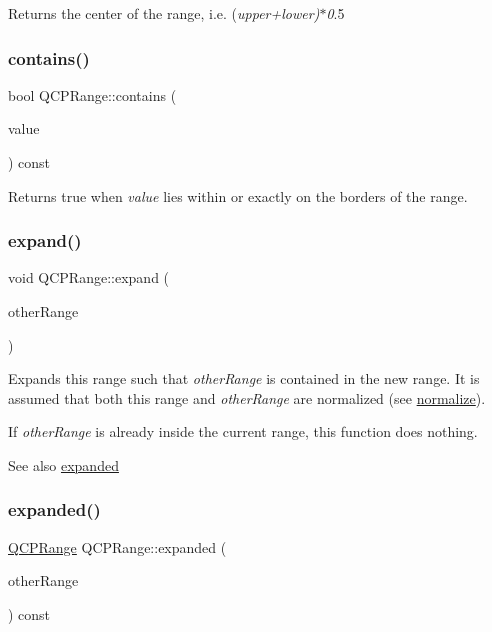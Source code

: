 Returns the center of the range, i.\+e. ({\itshape upper+{\itshape lower})$\ast$0}.5 \hypertarget{class_q_c_p_range_ae9842b48b6d38dc5e9607358e3083cc8}{}\label{class_q_c_p_range_ae9842b48b6d38dc5e9607358e3083cc8} 
\subsubsection{\texorpdfstring{contains()}{contains()}}
{\footnotesize\ttfamily bool Q\+C\+P\+Range\+::contains (\begin{DoxyParamCaption}\item[{double}]{value }\end{DoxyParamCaption}) const}

Returns true when {\itshape value} lies within or exactly on the borders of the range. \hypertarget{class_q_c_p_range_a0fa1bc8048be50d52bea93a8caf08305}{}\label{class_q_c_p_range_a0fa1bc8048be50d52bea93a8caf08305} 
\subsubsection{\texorpdfstring{expand()}{expand()}}
{\footnotesize\ttfamily void Q\+C\+P\+Range\+::expand (\begin{DoxyParamCaption}\item[{const \hyperlink{class_q_c_p_range}{Q\+C\+P\+Range} \&}]{other\+Range }\end{DoxyParamCaption})}

Expands this range such that {\itshape other\+Range} is contained in the new range. It is assumed that both this range and {\itshape other\+Range} are normalized (see \hyperlink{class_q_c_p_range_af914a7740269b0604d0827c634a878a9}{normalize}).

If {\itshape other\+Range} is already inside the current range, this function does nothing.

\begin{DoxySeeAlso}{See also}
\hyperlink{class_q_c_p_range_a9cbfb7cd06eac1839cae981e05c19633}{expanded} 
\end{DoxySeeAlso}
\hypertarget{class_q_c_p_range_a9cbfb7cd06eac1839cae981e05c19633}{}\label{class_q_c_p_range_a9cbfb7cd06eac1839cae981e05c19633} 
\subsubsection{\texorpdfstring{expanded()}{expanded()}}
{\footnotesize\ttfamily \hyperlink{class_q_c_p_range}{Q\+C\+P\+Range} Q\+C\+P\+Range\+::expanded (\begin{DoxyParamCaption}\item[{const \hyperlink{class_q_c_p_range}{Q\+C\+P\+Range} \&}]{other\+Range }\end{DoxyParamCaption}) const}

